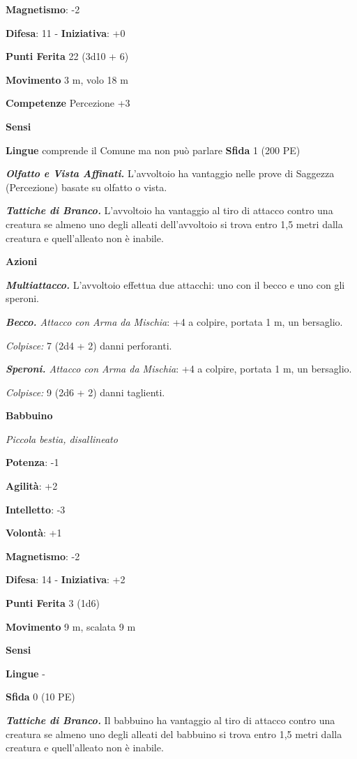 \begin{multicols}{2}
\textbf{Magnetismo}: -2

\textbf{Difesa}: 11 - \textbf{Iniziativa}: +0

\textbf{Punti Ferita} 22 (3d10 + 6)

\textbf{Movimento} 3 m, volo 18 m

\textbf{Competenze} Percezione +3

\textbf{Sensi} 

\textbf{Lingue} comprende il Comune ma non può parlare \textbf{Sfida} 1
(200 PE)\smallskip

\emph{\textbf{Olfatto e Vista Affinati.}} L'avvoltoio ha vantaggio nelle
prove di Saggezza (Percezione) basate su olfatto o vista.

\emph{\textbf{Tattiche di Branco.}} L'avvoltoio ha vantaggio al tiro di
attacco contro una creatura se almeno uno degli alleati dell'avvoltoio
si trova entro 1,5 metri dalla creatura e quell'alleato non è inabile.

\smallskip\textbf{Azioni}

\emph{\textbf{Multiattacco.}} L'avvoltoio effettua due attacchi: uno con
il becco e uno con gli speroni.

\emph{\textbf{Becco.} Attacco con Arma da Mischia}: +4 a colpire,
portata 1 m, un bersaglio.

\emph{Colpisce:} 7 (2d4 + 2) danni perforanti.

\emph{\textbf{Speroni.} Attacco con Arma da Mischia}: +4 a colpire,
portata 1 m, un bersaglio.

\emph{Colpisce:} 9 (2d6 + 2) danni taglienti.

\textbf{Babbuino}

\emph{Piccola bestia, disallineato}

\textbf{Potenza}: -1

\textbf{Agilità}: +2

\textbf{Intelletto}: -3

\textbf{Volontà}: +1

\textbf{Magnetismo}: -2

\textbf{Difesa}: 14 - \textbf{Iniziativa}: +2

\textbf{Punti Ferita} 3 (1d6)

\textbf{Movimento} 9 m, scalata 9 m

\textbf{Sensi} 

\textbf{Lingue} -

\textbf{Sfida} 0 (10 PE)\smallskip

\emph{\textbf{Tattiche di Branco.}} Il babbuino ha vantaggio al tiro di
attacco contro una creatura se almeno uno degli alleati del babbuino si
trova entro 1,5 metri dalla creatura e quell'alleato non è inabile.


\end{multicols}
